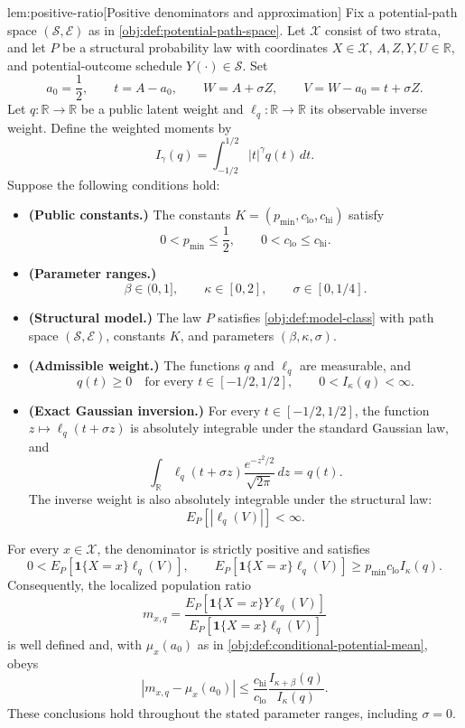 \begin{lemmav}{lem:positive-ratio}[Positive denominators and approximation]
Fix a potential-path space \((\mathcal S,\mathcal E)\) as in \cref{obj:def:potential-path-space}. Let \(\mathcal X\) consist of two strata, and let \(P\) be a structural probability law with coordinates \(X\in\mathcal X\), \(A,Z,Y,U\in\mathbb R\), and potential-outcome schedule \(Y(\cdot)\in\mathcal S\). Set
\[
a_0=\frac12,\qquad t=A-a_0,\qquad W=A+\sigma Z,\qquad V=W-a_0=t+\sigma Z.
\]
Let \(q:\mathbb R\to\mathbb R\) be a public latent weight and \(\ell_q:\mathbb R\to\mathbb R\) its observable inverse weight. Define the weighted moments by
\[
I_\gamma(q)=\int_{-1/2}^{1/2}|t|^\gamma q(t)\,dt.
\]
Suppose the following conditions hold:
\begin{itemize}
\item \textbf{(Public constants.)} The constants \(K=(p_{\min},c_{\mathrm{lo}},c_{\mathrm{hi}})\) satisfy
\[
0<p_{\min}\le\frac12,\qquad 0<c_{\mathrm{lo}}\le c_{\mathrm{hi}}.
\]
\item \textbf{(Parameter ranges.)}
\[
\beta\in(0,1],\qquad \kappa\in[0,2],\qquad \sigma\in[0,1/4].
\]
\item \textbf{(Structural model.)} The law \(P\) satisfies \cref{obj:def:model-class} with path space \((\mathcal S,\mathcal E)\), constants \(K\), and parameters \((\beta,\kappa,\sigma)\).
\item \textbf{(Admissible weight.)} The functions \(q\) and \(\ell_q\) are measurable, and
\[
q(t)\ge0\quad\text{for every }t\in[-1/2,1/2],
\qquad 0<I_\kappa(q)<\infty.
\]
\item \textbf{(Exact Gaussian inversion.)} For every \(t\in[-1/2,1/2]\), the function \(z\mapsto\ell_q(t+\sigma z)\) is absolutely integrable under the standard Gaussian law, and
\[
\int_{\mathbb R}\ell_q(t+\sigma z)\frac{e^{-z^2/2}}{\sqrt{2\pi}}\,dz=q(t).
\]
The inverse weight is also absolutely integrable under the structural law:
\[
E_P[|\ell_q(V)|]<\infty.
\]
\end{itemize}
For every \(x\in\mathcal X\), the denominator is strictly positive and satisfies
\[
0<E_P[\mathbf1\{X=x\}\ell_q(V)],
\qquad
E_P[\mathbf1\{X=x\}\ell_q(V)]
\ge p_{\min}c_{\mathrm{lo}}I_\kappa(q).
\]
Consequently, the localized population ratio
\[
m_{x,q}
=
\frac{E_P[\mathbf1\{X=x\}Y\ell_q(V)]}
     {E_P[\mathbf1\{X=x\}\ell_q(V)]}
\]
is well defined and, with \(\mu_x(a_0)\) as in \cref{obj:def:conditional-potential-mean}, obeys
\[
|m_{x,q}-\mu_x(a_0)|
\le
\frac{c_{\mathrm{hi}}}{c_{\mathrm{lo}}}
\frac{I_{\kappa+\beta}(q)}{I_\kappa(q)}.
\]
These conclusions hold throughout the stated parameter ranges, including \(\sigma=0\).
\end{lemmav}

